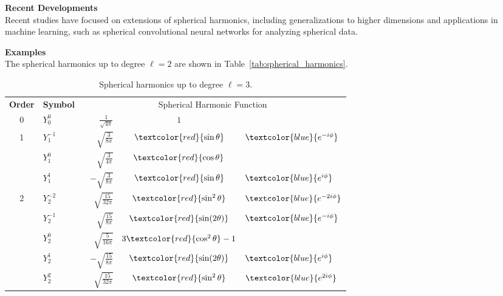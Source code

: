 \textbf{Recent Developments} \\
Recent studies have focused on extensions of spherical harmonics, including generalizations to higher dimensions and applications in machine learning, such as spherical convolutional neural networks for analyzing spherical data.

\textbf{Examples} \\
The spherical harmonics up to degree \( \ell = 2 \) are shown in Table~\ref{tab:spherical_harmonics}.

\begin{table}[h!]
    \centering
    \caption{Spherical harmonics up to degree \( \ell = 3 \).}
    \label{tab:spherical_harmonics_extended}
    \begin{tabular}{clrcl}
        \textbf{Order} & \textbf{Symbol} & \multicolumn{3}{c}{Spherical Harmonic Function} \\[5pt] %

        0 & \( Y_0^0 \) & \( \phantom{-} \frac{1}{\sqrt{4\pi}} \) & \( 1 \) & \\[5pt]

        1 & \( Y_1^{-1} \) & \( \sqrt{\frac{3}{8\pi}} \) & \( \textcolor{red}{\sin\theta} \) & \( \textcolor{blue}{e^{-i\phi}} \) \\[3pt]
          & \( Y_1^0 \) & \( \phantom{-} \sqrt{\frac{3}{4\pi}} \) & \( \textcolor{red}{\cos\theta} \) & \\[3pt]
          & \( Y_1^1 \) & \( -\sqrt{\frac{3}{8\pi}} \) & \( \textcolor{red}{\sin\theta} \) & \( \textcolor{blue}{e^{i\phi}} \) \\[5pt]

        2 & \( Y_2^{-2} \) & \( \sqrt{\frac{15}{32\pi}} \) & \( \textcolor{red}{\sin^2\theta} \) & \( \textcolor{blue}{e^{-2i\phi}} \) \\[3pt]
          & \( Y_2^{-1} \) & \( \sqrt{\frac{15}{8\pi}} \) & \( \textcolor{red}{\sin(2\theta)} \) & \( \textcolor{blue}{e^{-i\phi}} \) \\[3pt]
          & \( Y_2^0 \) & \( \phantom{-} \sqrt{\frac{5}{16\pi}} \) & \( 3\textcolor{red}{\cos^2\theta} - 1 \) & \\[3pt]
          & \( Y_2^1 \) & \( -\sqrt{\frac{15}{8\pi}} \) & \( \textcolor{red}{\sin(2\theta)} \) & \( \textcolor{blue}{e^{i\phi}} \) \\[3pt]
          & \( Y_2^2 \) & \( \sqrt{\frac{15}{32\pi}} \) & \( \textcolor{red}{\sin^2\theta} \) & \( \textcolor{blue}{e^{2i\phi}} \) \\[5pt]


\end{tabular}
\end{table}
